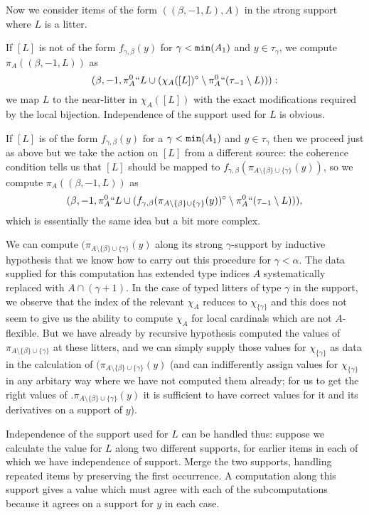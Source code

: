 \documentclass[112pt]{article}
\begin{document}
\begin{description}
Now we consider items of the form $((\beta,-1,L),A)$ in the strong support where $L$ is a litter.

If $[L]$ is not of the form $f_{\gamma,\beta}(y)$ for $\gamma<{\tt min}(A_1)$ and $y \in \tau_\gamma$,
we compute $\pi_A((\beta,-1,L))$ as $$(\beta,-1,\pi^0_A``L \cup (\chi_A([L])^\circ \setminus \pi^0_A``(\tau_{-1} \setminus L))):$$ we map
$L$ to the near-litter in $\chi_A([L])$ with the exact modifications required by the local bijection.  Independence of the support used for $L$ is obvious.

If $[L]$ is of the form $f_{\gamma,\beta}(y)$ for a $\gamma<{\tt min}(A_1)$ and $y \in \tau_\gamma$ then we proceed just as above but we take the action on $[L]$ from a different source:
the coherence condition tells us that $[L]$ should be mapped to $f_{\gamma,\beta}(\pi_{A \setminus \{\beta\} \cup \{\gamma\}}(y))$, so we compute
$\pi_A((\beta,-1,L))$ as $$(\beta,-1,\pi^0_A``L \cup (f_{\gamma,\beta}(\pi_{A \setminus \{\beta\} \cup \{\gamma\}}(y))^\circ \setminus \pi^0_A``(\tau_{-1}\setminus L))),$$  which is essentially the same idea but a bit more complex.

We can compute $(\pi_{A \setminus \{\beta\} \cup \{\gamma\}}(y)$ along its strong $\gamma$-support by inductive hypothesis that we know how to carry out this procedure for $\gamma<\alpha$.  The data supplied for this computation has extended type indices $A$ systematically replaced with
$A \cap (\gamma+1)$.  In the case of typed litters of type $\gamma$ in the support, we observe that the index of the relevant $\chi_A$ reduces
to $\chi_{\{\gamma\}}$ and this does not seem to give us the ability to compute $\chi_A$ for local cardinals which are not $A$-flexible.  But we have
already by recursive hypothesis computed the values of $\pi_{A \setminus \{\beta\} \cup \{\gamma\}}$ at these litters, and we can simply supply those values for $\chi_{\{\gamma\}}$ as data in the calculation of $(\pi_{A \setminus \{\beta\} \cup \{\gamma\}}(y)$ (and can indifferently assign values
for $\chi_{\{\gamma\}}$ in any arbitary way where we have not computed them already;  for us to get the right values of .$\pi_{A \setminus \{\beta\} \cup \{\gamma\}}(y)$ it is sufficient to have correct values for it and its derivatives on a support of $y$).

Independence of the support used for $L$ can be handled thus:  suppose we calculate the value for $L$ along two different supports, for earlier items in each of which we have independence of support.  Merge the two supports, handling repeated items by preserving the first occurrence.  A computation along this support gives a value which must agree with each of the subcomputations because it agrees on a support for $y$ in each case.


\end{description}
\end{document}
